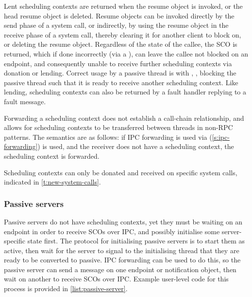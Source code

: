 Lent scheduling contexts are returned when the resume object is invoked, or the head resume object
is deleted. Resume objects 
can be invoked directly by the send phase of a system call, or indirectly, by using the
resume object in the receive phase of a system call, thereby clearing it for another client to block
on, or deleting the resume object.
Regardless of the state of the callee, the \gls{SCO} is returned, which if done
incorrectly (via a \send), can leave the callee not blocked on an endpoint, and consequently 
unable to receive further scheduling contexts via donation or lending. Correct usage by a passive thread is with \replyrecv,
\nbsendrecv, blocking the passive thread such that it is ready to receive another scheduling
context. Like lending, scheduling contexts can also be returned by a fault handler replying to a fault message.

Forwarding a scheduling context does not establish a call-chain relationship, and allows
for scheduling contexts to be transferred between threads in non-RPC patterns. The semantics are
as follows: if \gls{IPC} forwarding is used via \nbsendrecv (\cref{s:ipc-forwarding}) is used, and the receiver does not have a scheduling context,
the scheduling context is forwarded. 

Scheduling contexts can only be donated and received on specific system calls, indicated in
\cref{t:new-system-calls}. 

\subsubsection{Passive servers}
\label{sec:impl-passive-servers}

Passive servers do not have scheduling contexts, yet they must be waiting on an endpoint in order to
receive \glspl{SCO} over \gls{IPC}, and possibly initialise some server-specific state first.
The protocol for initialising passive servers is to start them as
active, then wait for the server to signal to the initialising thread that they are ready to be
converted to passive. IPC forwarding can be used to do this, so the passive server can send a
message on one endpoint or notification object, then wait on another to receive \glspl{SCO} over
IPC. Example user-level code for this process is 
provided in \cref{list:passive-server}. 

